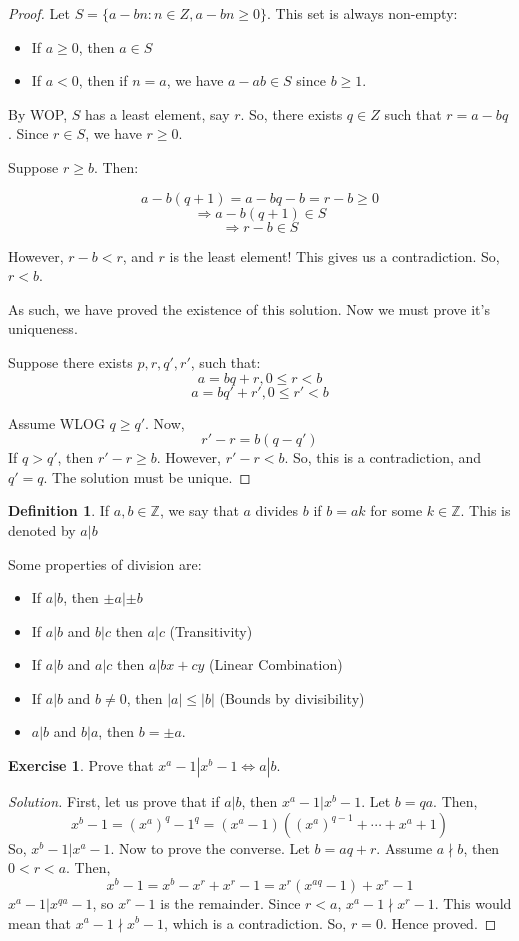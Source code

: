 \documentclass[12pt,letterpaper]{book}
\theoremstyle{definition}
\newtheorem{definition}{Definition} %
\newtheorem*{exercise}{Exercise}
\newenvironment{solution}
  {\renewcommand\qedsymbol{$\blacksquare$}\begin{proof}[Solution]}
  {\end{proof}}
\newcommand{\Z}{\mathbb{Z}}
\begin{document}
\begin{proof}

Let $S = \{a - bn : n \in Z, a-bn \geq 0\}$. This set is always non-empty:
\begin{itemize}
  \item If $a \geq 0$, then $a \in S$
  \item If $a<0$, then if $n = a$, we have $a-ab \in S$ since $b \geq 1$.
\end{itemize}

By WOP, $S$ has a least element, say $r$. So, there exists $q \in Z$ such that $r = a-bq$. Since $r \in S$, we have $r \geq 0$.

Suppose $r \geq b$. Then:

\[a-b(q+1) = a-bq-b = r-b \geq 0\]
\[ \Rightarrow a-b(q+1) \in S\]
\[\Rightarrow r-b \in S\]

However, $r-b < r$, and $r$ is the least element! This gives us a contradiction. So, $r < b$.

As such, we have proved the existence of this solution. Now we must prove it's uniqueness.

Suppose there exists $p,r,q',r'$, such that:
\[a = bq+r, 0 \leq r < b\]
\[a = bq'+r', 0 \leq r' < b\]

Assume WLOG $q \geq q'$. Now,
\[r'-r = b(q-q')\]
If $q > q'$, then $r'-r \geq b$. However, $r'-r < b$. So, this is a contradiction, and $q' = q$. The solution must be unique.

\end{proof}

\begin{definition}
  If $a,b \in \Z$, we say that $a$ divides $b$ if $b=ak$ for some $k \in \Z$. This is denoted by $a|b$
\end{definition}

Some properties of division are:

\begin{itemize}
  \item If $a|b$, then $\pm a | \pm b$
  \item If $a|b$ and $b|c$ then $a|c$ (Transitivity)
  \item If $a|b$ and $a|c$ then $a|bx+cy$ (Linear Combination)
  \item If $a|b$ and $b \neq 0$, then $|a| \leq |b|$ (Bounds by divisibility)
  \item $a|b$ and $b|a$, then $b = \pm a$.
\end{itemize}

\begin{exercise}
  Prove that $x^a-1|x^b-1 \Leftrightarrow a|b$.
\end{exercise}
\begin{solution}
  First, let us prove that if $a|b$, then $x^a-1|x^b-1$. Let $b=qa$. Then,
  \[x^b-1 = (x^a)^q-1^q = (x^a-1)((x^a)^{q-1} + \cdots + x^a + 1)\]
  So, $x^b-1 | x^a-1$.
  Now to prove the converse. Let $b=aq+r$. Assume $a \nmid b$, then $0 < r < a$. Then,
  \[x^b-1 = x^b - x^r + x^r - 1 = x^r(x^{aq} - 1) + x^r-1\]
  $x^a-1|x^{qa}-1$, so $x^r-1$ is the remainder. Since $r < a$, $x^a-1 \nmid x^r-1$. This would mean that $x^a-1 \nmid x^b-1$, which is a contradiction. So, $r = 0$. Hence proved.
\end{solution}
\end{document}
